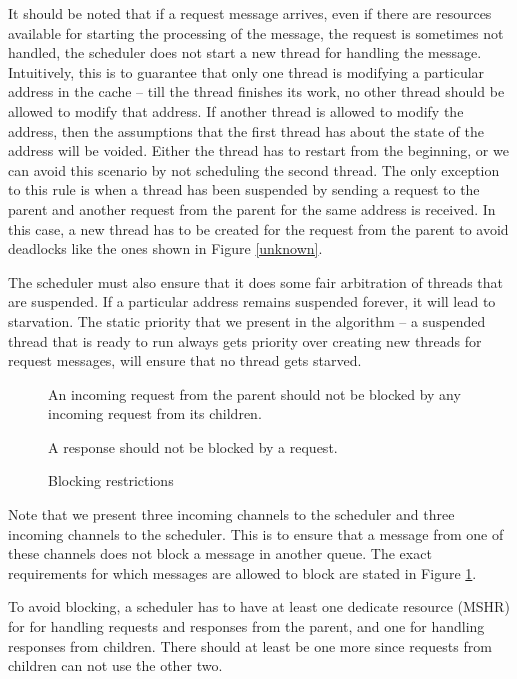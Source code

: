 It should be noted that if a request message arrives, even if there are
resources available for starting the processing of the message, the request is
sometimes not handled, \ie the scheduler does not start a new thread for
handling the message. Intuitively, this is to guarantee that only one thread is
modifying a particular address in the cache -- till the thread finishes its
work, no other thread should be allowed to modify that address. If another
thread is allowed to modify the address, then the assumptions that the first
thread has about the state of the address will be voided. Either the thread has
to restart from the beginning, or we can avoid this scenario by not scheduling
the second thread. The only exception to this rule is when a thread has been
suspended by sending a request to the parent and another request from the parent
for the same address is received. In this case, a new thread has to be created
for the request from the parent to avoid deadlocks like the ones shown in Figure
\ref{unknown}.

The scheduler must also ensure that it does some fair arbitration of threads
that are suspended. If a particular address remains suspended forever, it will
lead to starvation. The static priority that we present in the algorithm -- a
suspended thread that is ready to run always gets priority over creating new
threads for request messages, will ensure that no thread gets starved.

\begin{figure}\small
\begin{requirement}
An incoming request from the parent should not be blocked by any
incoming request from its children.\label{cReqNoBlockPReq}
\end{requirement}
\begin{requirement}
A response should not be blocked by a request.
\label{reqNoBlockResp}
\end{requirement}
\caption{Blocking restrictions}
\label{blocking}
\end{figure}

Note that we present three incoming channels to the scheduler and three incoming
channels to the scheduler. This is to ensure that a message from one of these
channels does not block a message in another queue. The exact requirements for
which messages are allowed to block are stated in Figure \ref{blocking}.

To avoid blocking, a scheduler has to have at least one dedicate resource
(MSHR) for for handling requests and responses from the parent, and one for
handling responses from children. There should at least be one more since
requests from children can not use the other two.


